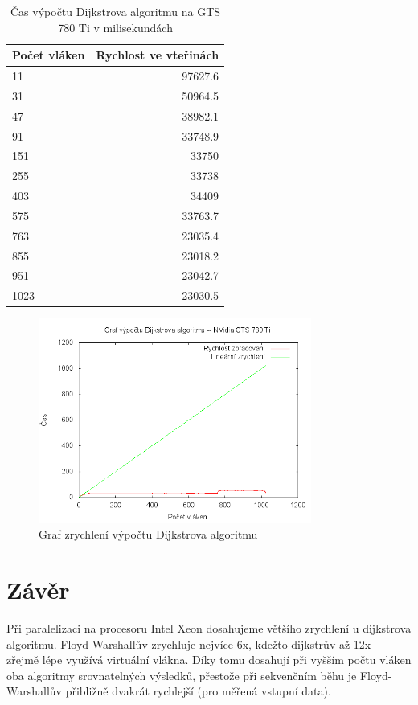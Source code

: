 \documentclass[10pt,a4paper]{article}
\begin{document}
\begin{table}[H]
  \centering
	\caption{Čas výpočtu Dijkstrova algoritmu na GTS 780 Ti v milisekundách}
	\begin{tabular}{| l | r |}
\hline
Počet vláken & Rychlost ve vteřinách \\ \hline
11 & 97627.6 \\ \hline
31 & 50964.5 \\ \hline
47 & 38982.1 \\ \hline
91 & 33748.9 \\ \hline
151 & 33750 \\ \hline
255 & 33738 \\ \hline
403 & 34409 \\ \hline
575 & 33763.7 \\ \hline
763 & 23035.4 \\ \hline
855 & 23018.2 \\ \hline
951 & 23042.7 \\ \hline
1023 & 23030.5 \\ \hline
	\end{tabular}
  \label{tab:cufltwo}
\end{table}


\begin{figure}[H]
  \centering
    \includegraphics[width=0.8\textwidth]{graf_dikstra_gts_780_Ti.png}
  \caption{Graf zrychlení výpočtu Dijkstrova algoritmu}
  \label{fig:dijkscuda}
\end{figure}


\newpage

\section{Závěr}

Při paralelizaci na procesoru Intel Xeon dosahujeme většího zrychlení u dijkstrova algoritmu. Floyd-Warshallův zrychluje nejvíce 6x, kdežto dijkstrův až 12x - zřejmě lépe využívá virtuální vlákna. Díky tomu dosahují při vyšším počtu vláken oba algoritmy srovnatelných výsledků, přestože při sekvenčním běhu je Floyd-Warshallův přibližně dvakrát rychlejší (pro měřená vstupní data).
\end{document}
